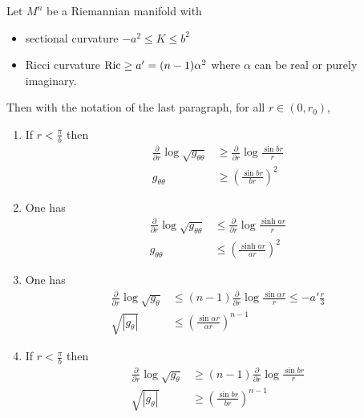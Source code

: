 \begin{theorem}
\label{thm:vol-comparison}
Let \(M^n\) be a Riemannian manifold with
\begin{itemize}
\item sectional curvature \(-a^2 \leq K\leq b^2\)
\item Ricci curvature \({\rm Ric} \geq a' = (n-1)\alpha^2\) where \(\alpha\) can be real or
purely imaginary.
\end{itemize}
Then with the notation of the last paragraph, for all \(r \in (0, r_0)\),
\begin{enumerate}
\item If \(r<\frac{\pi}{b}\) then
\begin{equation}
\label{eq:comp-1}
\begin{split}
 \frac{\partial}{\partial r}\log   \sqrt{g_{\theta\theta}} &\geq \frac{\partial}{\partial r}\log \frac{\sin br}{r}\\  
  g_{\theta\theta} &\geq \left(\frac{\sin br}{br}\right)^2
\end{split}   
\end{equation}
\item One has
\begin{equation}
\label{eq:comp-2}
\begin{split}
 \frac{\partial}{\partial r}\log   \sqrt{g_{\theta\theta}} &\leq \frac{\partial}{\partial r}\log \frac{\sinh ar}{r}\\  
 g_{\theta\theta} &\leq \left(\frac{\sinh ar}{ar}\right)^2
\end{split}   
\end{equation}
\item One has
\begin{equation}
\label{eq:comp-3}
\begin{split}
 \frac{\partial}{\partial r}\log   \sqrt{g_{\theta}} &\leq (n-1) \frac{\partial}{\partial r}\log \frac{\sin \alpha r}{r} \leq -a' \frac{r}{3}\\  
  \sqrt{|g_{\theta}|} &\leq \left(\frac{\sin \alpha r}{\alpha r}\right)^{n-1}
\end{split}   
\end{equation}
\item If \(r<\frac{\pi}{b}\) then
\begin{equation}
\label{eq:comp-4}
\begin{split}
 \frac{\partial}{\partial r}\log   \sqrt{g_{\theta}} &\geq (n-1) \frac{\partial}{\partial r}\log \frac{\sin b r}{r}\\  
 \sqrt{|g_{\theta}|} &\geq \left(\frac{\sin br}{br}\right)^{n-1}       
\end{split}   
\end{equation}
\end{enumerate}
\end{theorem}

